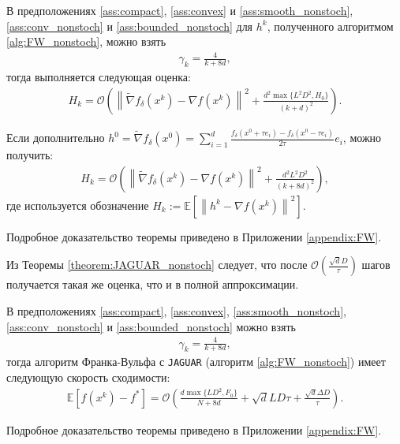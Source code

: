     \begin{theorem} \label{theorem:JAGUAR_nonstoch}
    
        В предположениях \ref{ass:compact}, \ref{ass:convex} и \ref{ass:smooth_nonstoch}, \ref{ass:conv_nonstoch} и \ref{ass:bounded_nonstoch} для $h^k$, полученного алгоритмом \ref{alg:FW_nonstoch}, можно взять
        \begin{align*}
            \gamma_k = \frac{4}{k + 8d},
        \end{align*}
        тогда выполняется следующая оценка:
        \begin{align*}
            H_k = \mathcal{O} \left( \left\| \widetilde{\nabla}f_{\delta}(x^k) - \nabla f(x^k) \right\|^2 + \frac{d^2 \max\{L^2 D^2, H_0\}}{(k + d)^2} \right).
        \end{align*}
    
        \noindent Если дополнительно $h^0 = \widetilde{\nabla} f_\delta (x^0) = \sum\limits_{i = 1}^d \frac{f_\delta (x^0 + \tau e_i) - f_\delta (x^0 - \tau e_i)}{2 \tau} e_i$, можно получить:
        \begin{align*}
            H_k = \mathcal{O} \left( \left\| \widetilde{\nabla}f_{\delta}(x^k) - \nabla f(x^k) \right\|^2 +\frac{d^2 L^2 D^2}{(k + 8d)^2} \right),
        \end{align*}
        где используется обозначение $H_k := \mathbb{E} \left[ \left\| h^k - \nabla f(x^k) \right\|^2 \right]$.
        
        \noindent Подробное доказательство теоремы приведено в Приложении \ref{appendix:FW}.
        
    \end{theorem}

    Из Теоремы \ref{theorem:JAGUAR_nonstoch} следует, что после $\mathcal{O} \left( \frac{\sqrt{d} D}{\tau} \right)$ шагов получается такая же оценка, что и в полной аппроксимации.

    \begin{theorem} \label{theorem:FW_nonstoch}
        
        В предположениях \ref{ass:compact}, \ref{ass:convex}, \ref{ass:smooth_nonstoch}, \ref{ass:conv_nonstoch} и \ref{ass:bounded_nonstoch} можно взять
        \begin{align*}
            \gamma_k = \frac{4}{k + 8d},
        \end{align*}
        тогда алгоритм Франка-Вульфа с \texttt{JAGUAR} (алгоритм \ref{alg:FW_nonstoch}) имеет следующую скорость сходимости:
        \begin{align*}
            \mathbb{E} \left[ f(x^k) - f^* \right] = \mathcal{O} \left( \frac{d \max \{L D^2, F_0 \}}{N + 8d} + \sqrt{d} L D \tau + \frac{\sqrt{d} \Delta D}{\tau}\right).
        \end{align*}

        \noindent Подробное доказательство теоремы приведено в Приложении \ref{appendix:FW}.
        
    \end{theorem}

